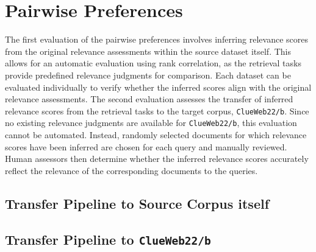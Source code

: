 \section{Pairwise Preferences}\label{eval-pairwise-preferences}

The first evaluation of the pairwise preferences involves inferring relevance scores from the original relevance assessments within the source dataset itself. This allows for an automatic evaluation using rank correlation, as the retrieval tasks provide predefined relevance judgments for comparison. Each dataset can be evaluated individually to verify whether the inferred scores align with the original relevance assessments. The second evaluation assesses the transfer of inferred relevance scores from the retrieval tasks to the target corpus, \texttt{ClueWeb22/b}. Since no existing relevance judgments are available for \texttt{ClueWeb22/b}, this evaluation cannot be automated. Instead, randomly selected documents for which relevance scores have been inferred are chosen for each query and manually reviewed. Human assessors then determine whether the inferred relevance scores accurately reflect the relevance of the corresponding documents to the queries.

\subsection{Transfer Pipeline to Source Corpus itself}\label{eval-pairwise-preferences-source}



\subsection{Transfer Pipeline to \texttt{ClueWeb22/b}}\label{eval-pairwise-preferences-target}